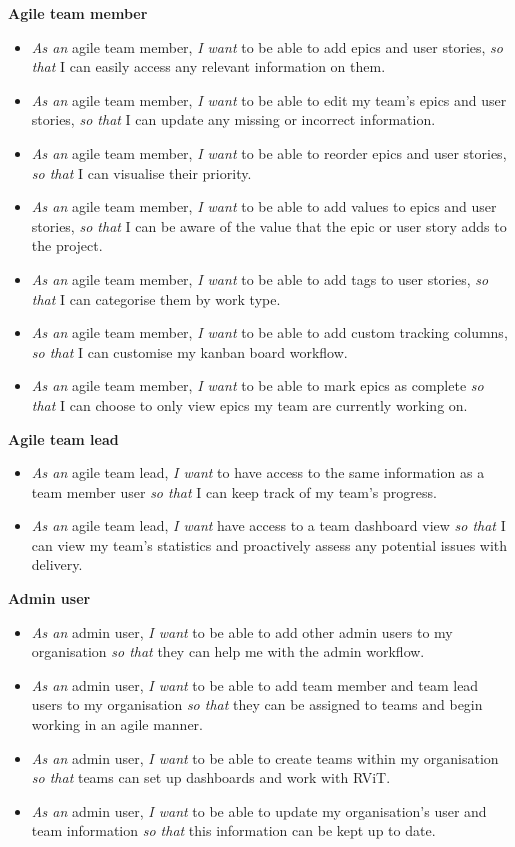 \documentclass[l4proj.tex]{subfiles}
\begin{document}
\textbf{Agile team member}
\begin{itemize}
    \item \textit{As an} agile team member, \textit{I want} to be able to add epics and user stories, \textit{so that} I can easily access any relevant information on them.
    \item \textit{As an} agile team member, \textit{I want} to be able to edit my team's epics and user stories, \textit{so that} I can update any missing or incorrect information.
    \item \textit{As an} agile team member, \textit{I want} to be able to reorder epics and user stories, \textit{so that} I can visualise their priority.
    \item \textit{As an} agile team member, \textit{I want} to be able to add values to epics and user stories, \textit{so that} I can be aware of the value that the epic or user story adds to the project.
    \item \textit{As an} agile team member, \textit{I want} to be able to add tags to user stories, \textit{so that} I can categorise them by work type.
    \item \textit{As an} agile team member, \textit{I want} to be able to add custom tracking columns, \textit{so that} I can customise my kanban board workflow.
    \item \textit{As an} agile team member, \textit{I want} to be able to mark epics as complete \textit{so that} I can choose to only view epics my team are currently working on.
\end{itemize}

\textbf{Agile team lead}
\begin{itemize}
    \item \textit{As an} agile team lead, \textit{I want} to have access to the same information as a team member user \textit{so that} I can keep track of my team's progress.
    \item \textit{As an} agile team lead, \textit{I want} have access to a team dashboard view \textit{so that} I can view my team's statistics and proactively assess any potential issues with delivery.
\end{itemize}
    
\textbf{Admin user}
\begin{itemize}
    \item \textit{As an} admin user, \textit{I want} to be able to add other admin users to my organisation \textit{so that} they can help me with the admin workflow.
    \item \textit{As an} admin user, \textit{I want} to be able to add team member and team lead users to my organisation \textit{so that} they can be assigned to teams and begin working in an agile manner.
    \item \textit{As an} admin user, \textit{I want} to be able to create teams within my organisation \textit{so that} teams can set up dashboards and work with RViT.
    \item \textit{As an} admin user, \textit{I want} to be able to update my organisation's user and team information \textit{so that} this information can be kept up to date.
\end{itemize}
\end{document}
